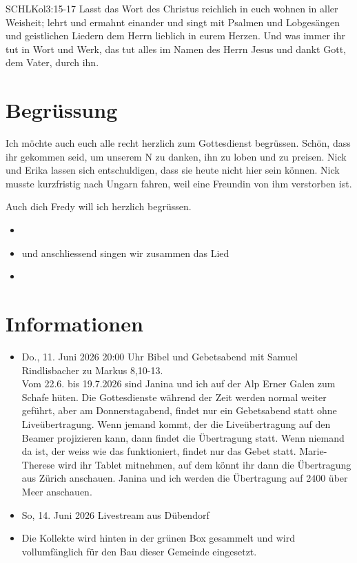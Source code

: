 \documentclass[fontsize=14pt]{mybib}
\newcommand{\Name}{Fredy}
\begin{document}
\begin{bibelbox}{SCHL}{Kol}{3:15-17}
    Lasst das Wort des Christus reichlich in euch wohnen in aller Weisheit; lehrt und ermahnt einander und singt mit Psalmen und Lobgesängen und geistlichen Liedern dem Herrn lieblich in eurem Herzen. Und was immer ihr tut in Wort und Werk, das tut alles im Namen des Herrn Jesus und dankt Gott, dem Vater, durch ihn.
\end{bibelbox}
\section{Begrüssung}
Ich möchte auch euch alle recht herzlich zum Gottesdienst begrüssen. Schön, dass ihr gekommen seid, um unserem \herr N zu danken, ihn zu loben und zu preisen. Nick und Erika lassen sich entschuldigen, dass sie heute nicht hier sein können. Nick musste kurzfristig nach Ungarn fahren, weil eine Freundin von ihm verstorben ist. 

Auch dich \Name{} will ich herzlich begrüssen. 
\begin{itemize}
    \item[] 
    \item[] und anschliessend singen wir zusammen das Lied
    \item[] 
\end{itemize}

\section{Informationen}
\begin{itemize}
    \item {} Do., 11. Juni 2026 20:00 Uhr Bibel und Gebetsabend mit Samuel Rindlisbacher zu Markus 8,10-13.\\
    Vom 22.6. bis 19.7.2026 sind Janina und ich auf der Alp Erner Galen zum Schafe hüten. Die Gottesdienste während der Zeit werden normal weiter geführt, aber am Donnerstagabend, findet nur ein Gebetsabend statt ohne Liveübertragung. Wenn jemand kommt, der die Liveübertragung auf den Beamer projizieren kann, dann findet die Übertragung statt. Wenn niemand da ist, der weiss wie das funktioniert, findet nur das Gebet statt. Marie-Therese wird ihr Tablet mitnehmen, auf dem könnt ihr dann die Übertragung aus Zürich anschauen. Janina und ich werden die Übertragung auf 2400 über Meer anschauen.
    \item {} So, 14. Juni 2026 Livestream aus Dübendorf
    \item {} Die Kollekte wird hinten in der grünen Box gesammelt und wird vollumfänglich für den Bau dieser Gemeinde eingesetzt.
\end{itemize}
\end{document}
